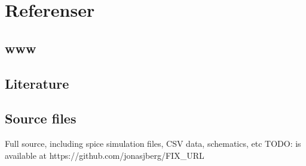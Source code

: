 \documentclass[11pt,a4paper]{article}
\begin{document}
\newpage

\section{Referenser}\label{referenser}

\subsection{www}\label{}

\subsection{Literature}\label{}

\subsection{Source files}\label{sources}
Full source, including spice simulation files, CSV data, schematics, etc
TODO: is available at https://github.com/jonasjberg/FIX_URL


\end{document}
